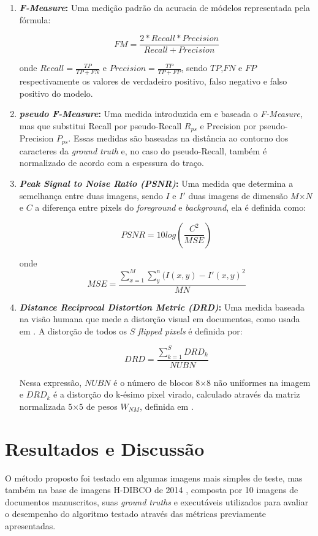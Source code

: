 \documentclass[conference]{IEEEtran}
\begin{document}
\begin{enumerate}
    \item \textbf{\textit{F-Measure}:} Uma medição padrão da acuracia de módelos representada pela fórmula:
    
    \[FM = \frac{2*Recall*Precision}{Recall+Precision}\] 

    onde $Recall = \frac{TP}{TP+FN}$ e $Precision = \frac{TP}{TP+FP}$, sendo $TP$,$FN$ e $FP$ respectivamente os valores de verdadeiro positivo, falso negativo e falso positivo do modelo.

    \item \textbf{\textit{pseudo F-Measure}:} Uma medida introduzida em \cite{pfm} e baseada o \textit{F-Measure}, mas que substitui Recall por pseudo-Recall $R_{ps}$ e Precision por pseudo-Precision $P_{ps}$. Essas medidas são baseadas na distância ao contorno dos caracteres da \textit{ground truth} e, no caso do pseudo-Recall, também é normalizado de acordo com a espessura do traço.

    \item \textbf{\textit{Peak Signal to Noise Ratio (PSNR)}:} Uma medida que determina a semelhança entre duas imagens,  sendo $I$ e $I'$ duas imagens de dimensão $M$×$N$ e $C$ a diferença entre pixels do \textit{foreground} e \textit{background}, ela é definida como:

    \[PSNR = 10log(\frac{C^2}{MSE})\]

    onde \[MSE = \frac{\sum_{x=1}^{M}\sum_{y}^{n}(I(x,y) - I'(x,y)^2}{MN}\]
    \item \textbf{\textit{Distance Reciprocal Distortion Metric (DRD)}:} Uma medida baseada na visão humana que mede a distorção visual em documentos, como usada em \cite{drd}. A distorção de todos os $S$ \textit{flipped pixels} é definida por:

    \[DRD = \frac{\sum_{k=1}^{S}DRD_{k}}{NUBN}\]

    Nessa expressão, $NUBN$ é o número de blocos $8$×$8$ não uniformes na imagem e $DRD_{k}$ é a distorção do k-ésimo pixel virado, calculado através da matriz normalizada $5$×$5$ de pesos $W_{NM}$, definida em \cite{drd}.

    
\end{enumerate}

\section{Resultados e Discussão}
O método proposto foi testado em algumas imagens mais simples de teste, mas também na base de imagens H-DIBCO de 2014 \cite{hdibco2014}, composta por 10 imagens de documentos manuscritos, suas \textit{ground truths} e executáveis utilizados para avaliar o desempenho do algoritmo testado através das métricas previamente apresentadas. 
\end{document}

